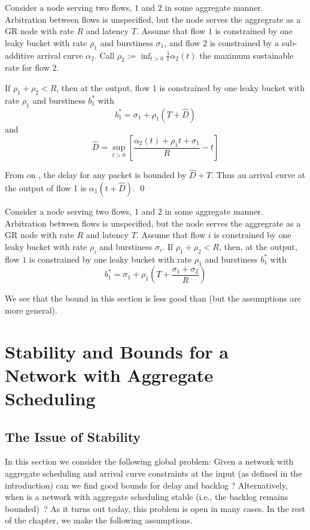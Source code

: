 \begin{theorem}
 Consider a node serving two flows, $1$
and $2$ in some aggregate manner. Arbitration between flows is
unspecified, but the node serves the aggregrate as a GR node with
rate $R$ and latency $T$. Assume that flow $1$ is constrained by
one leaky bucket with rate $\rho_1$ and burstiness $\sigma_1$, and
flow 2 is constrained by a sub-additive arrival curve $\alpha_2$.
Call $\rho_2:=\inf_{t>0} \frac{1}{t}\alpha_2(t)$ the maximum
sustainable rate for flow $2$.

If $\rho_1 + \rho_2 < R$, then at the output, flow $1$ is
constrained by one leaky bucket with rate $\rho_1$ and burstiness
$b^*_1$ with
$$
b^*_1= \sigma_1 +\rho_1 \left(T+\hat{D}\right)
$$
and
$$
 \hat{D}=
 \sup_{t > 0} [\frac{\alpha_2(t)+\rho_1 t + \sigma_1}{R} -  t]
$$
\end{theorem}
\pr
From  on , the
delay for any packet is bounded by $\hat{D} +T$. Thus an arrival
curve at the output of flow 1 is $\alpha_1(t+\hat{D})$. \qed
\begin{corollary}
 Consider a node serving two flows, $1$
and $2$ in some aggregate manner. Arbitration between flows is
unspecified, but the node serves the aggregrate as a GR node with
rate $R$ and latency $T$. Assume that flow $i$ is constrained by
one leaky bucket with rate $\rho_i$ and burstiness $\sigma_i$. If
$\rho_1 + \rho_2 < R$,  then, at the output, flow $1$ is
constrained by one leaky bucket with rate $\rho_1$ and burstiness
$b^*_1$ with
$$
b^*_1= \sigma_1 +\rho_1 \left(T+\frac{\sigma_1+\sigma_2}{R}\right)
$$
\end{corollary}
We see that the bound in this section is less good than
 (but the assumptions are more general).

\section{Stability and Bounds for a Network with Aggregate Scheduling}

\subsection{The Issue of Stability}
In this section we consider the following global problem: Given a network with aggregate
scheduling and arrival curve constraints at the input (as defined in the introduction) can we
find good bounds for delay and backlog ? Alternatively, when is a network with aggregate
scheduling stable (i.e., the backlog remains bounded)~? As it turns out today, this problem is
open in many cases. In the rest of the chapter, we make the following assumptions.
